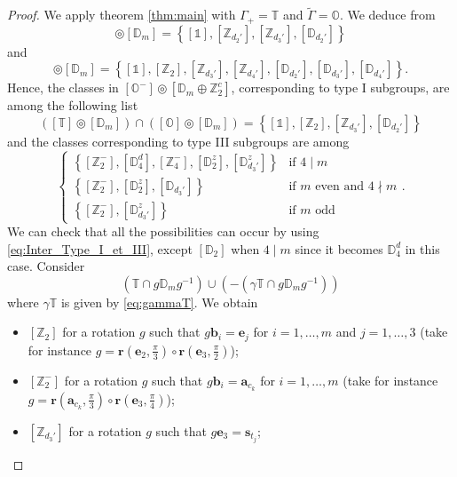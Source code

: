 \documentclass[11pt,a4paper]{amsart}
\theoremstyle{definition}
\newcommand{\ZZ}{\mathbb{Z}}                %
\newcommand{\octa}{\mathbb{O}}              %
\newcommand{\tetra}{\mathbb{T}}             %
\newcommand{\DD}{\mathbb{D}}                %
\newcommand{\1}{\mathds{1}}		            %
\newcommand{\ee}{\pmb{e}}                   %
\newcommand{\vR}{\mathbf{r}}
\newcommand{\bb}{\mathbf{b}}
\newcommand{\set}[1]{\left\{#1\right\}}     %
\begin{document}
\begin{proof}
	We apply theorem \ref{thm:main} with $\Gamma_+=\tetra$ and $\tilde{\Gamma}=\octa$. We deduce from \cite[table 1]{Olive2019}
	\begin{equation*}
	[\tetra]\circledcirc [\DD_m]=\set{[\1],[\ZZ_{d_2'}],[\ZZ_{d_3'}],[\DD_{d_2'}]} 
	\end{equation*}
	and
	\begin{equation*}
	[\octa]\circledcirc [\DD_m]=\set{[\1],[\ZZ_2],[\ZZ_{d_3'}],[\ZZ_{d_4'}],[\DD_{d_2'}],[\DD_{d_3'}],[\DD_{d_4'}]}.
	\end{equation*}
	Hence, the classes in $[\octa^-]\circledcirc [\DD_m\oplus \ZZ_2^c]$, corresponding to type I subgroups, are among the following list 
	\begin{equation*}
	([\tetra]\circledcirc [\DD_m])\cap ([\octa]\circledcirc[\DD_m])=
	\set{[\1],[\ZZ_2],[\ZZ_{d_3'}],[\DD_{d_2'}]}
	\end{equation*}
	and the classes corresponding to type III subgroups are among
	\begin{equation*}
	\begin{cases}
	\set{[\ZZ_2^-],[\DD_{4}^d],[\ZZ_{4}^-],[\DD_{2}^z],[\DD_{d_3'}^z]} & \text{if $4\mid m$}\\
	\set{[\ZZ_2^-],[\DD_{2}^z],[\DD_{d_3'}]} & \text{if $m$ even and $4\nmid m$}\\
	\set{[\ZZ_2^-],[\DD_{d_3'}^z]} & \text{if $m$ odd}
	\end{cases}.
	\end{equation*}
 We can check that all the possibilities can occur by using \eqref{eq:Inter_Type_I_et_III}, except $[\DD_2]$ when $4\mid m$ since it becomes $\DD_4^d$ in this case. Consider
	\begin{equation*}
	(\tetra\cap g \DD_m g^{-1})\cup (-(\gamma\tetra\cap g \DD_m g^{-1}))
	\end{equation*}
	where $\gamma \tetra$ is given by \eqref{eq:gammaT}.
	We obtain
	\begin{itemize}
		\item $[\ZZ_2]$ for a rotation $g$ such that $g\bb_i=\ee_j$ for $i=1,\dotsc,m$ and $j=1,\dots,3$ (take for instance $g=\vR\left(\ee_2,\frac{\pi}{3}\right)\circ \vR\left(\ee_3,\frac{\pi}{2}\right)$);
		\item $[\ZZ_2^-]$ for a rotation $g$ such that $g\bb_i=\pmb{a}_{c_k}$ for $i=1,\dotsc,m$ (take for instance $g=\vR\left(\pmb{a}_{c_k},\frac{\pi}{3}\right)\circ \vR\left(\ee_3,\frac{\pi}{4}\right)$);
		\item $[\ZZ_{d_3'}]$ for a rotation $g$ such that $g\ee_3=\pmb{s}_{t_j}$;

\end{itemize}
\end{proof}
\end{document}
